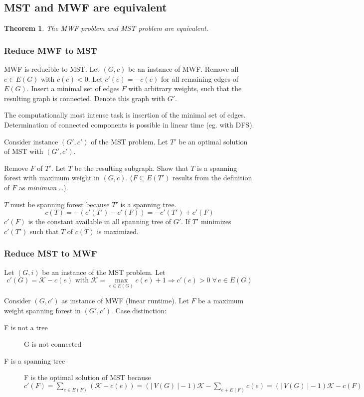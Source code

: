 \documentclass{article}
\newtheorem{theorem}{Theorem}
\newcommand{\card}[1]{\left|\:\!#1\:\!\right|}
\newcommand{\fall}{\;\forall\,}
\begin{document}
\subsection{MST and MWF are equivalent}
%
\begin{theorem}\label{proposition-2.1}
  The MWF problem and MST problem are equivalent.
\end{theorem}

\subsubsection{Reduce MWF to MST}
%
MWF is reducible to MST. Let $(G, c)$ be an instance of MWF. Remove all $e \in E(G)$ with $c(e) < 0$. Let $c'(e) = -c(e)$ for all remaining edges of $E(G)$. Insert a minimal set of edges $F$ with arbitrary weights, such that the resulting graph is connected. Denote this graph with $G'$.

The computationally most intense task is insertion of the minimal set of edges. Determination of connected components is possible in linear time (eg. with DFS).

Consider instance $(G', c')$ of the MST problem.  Let $T'$ be an optimal solution of MST with $(G', c')$.

Remove $F$ of $T'$. Let $T$ be the resulting subgraph. Show that $T$ is a spanning forest with maximum weight in $(G, c)$. ($F \subseteq E(T')$ results from the definition of $F$ as \emph{minimum} \dots).

$T$ must be spanning forest because $T'$ is a spanning tree.
\[
  c(T) = -(c'(T') - c'(F)) = -c'(T') + c'(F)
\]
$c'(F)$ is the constant available in all spanning tree of $G'$.
If $T'$ minimizes $c'(T')$ such that $T$ of $c(T)$ is maximized.

\subsubsection{Reduce MST to MWF}
%
Let $(G, i)$ be an instance of the MST problem. Let
\[
  c'(G) = \mathcal{K} - c(e) \text{ with } \mathcal{K} = \max_{e \in E(G)} c(e) + 1
    \Rightarrow c'(e) > 0 \fall e \in E(G)
\]

Consider $(G, c')$ as instance of MWF (linear runtime). Let $F$ be a maximum weight spanning forest in $(G', c')$. Case distinction:
\begin{description}
  \item[F is not a tree] G is not connected
  \item[F is a spanning tree] F is the optimal solution of MST because $c'(F) = \sum_{e \in E(F)} (\mathcal{K} - c(e)) = (\card{V(G)} - 1) \mathcal{K} - \sum_{e + E(F)} c(e) = (\card{V(G)} - 1) \mathcal{K} - c(F)$
\end{description}
\end{document}
